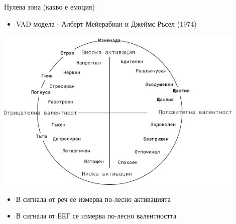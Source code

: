 \documentclass[9pt]{beamer}
\begin{document}
    \begin{frame}{Нулева зона (какво е емоция)}
        \begin{itemize}
            \item VAD модела - Алберт Мейерабиан и Джеймс Ръсел (1974)
        \end{itemize}
        \pause
        \begin{center}
            \includegraphics[width=0.9\textwidth]{valence_arousal}%
        \end{center}
        \pause
        \begin{itemize}
            \item В сигнала от реч се измерва по-лесно активацията
            \pause
            \item В сигнала от ЕЕГ се измерва по-лесно валентността
        \end{itemize}
    \end{frame}
\end{document}
